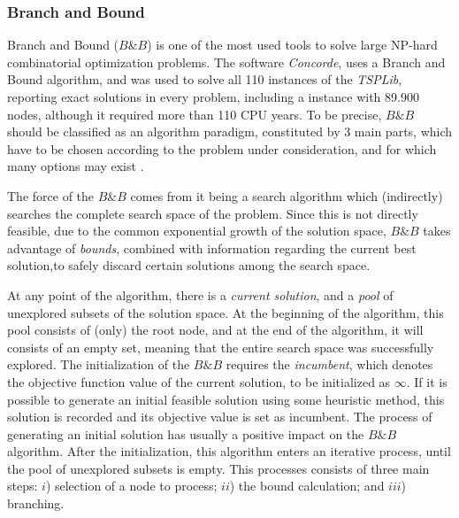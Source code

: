 \subsubsection{Branch and Bound}
\label{sec:bnb}

Branch and Bound ($B\&B$) is one of the most used tools to solve large NP-hard combinatorial optimization problems. The software \textit{Concorde}, uses a Branch and Bound algorithm, and was used to solve all 110 instances of the \textit{TSPLib}, reporting exact solutions in every problem, including a instance with 89.900 nodes, although it required more than 110 CPU years. To be precise, $B\&B$ should be classified as an algorithm paradigm, constituted by 3 main parts, which have to be chosen according to the problem under consideration, and for which many options may exist \cite{bnb_review}.

The force of the $B\&B$ comes from it being a search algorithm which (indirectly) searches the complete search space of the problem. Since this is not directly feasible, due to the common exponential growth of the solution space, $B\&B$ takes advantage of \textit{bounds}, combined with information regarding the current best solution,to safely discard certain solutions among the search space.

At any point of the algorithm, there is a \textit{current solution}, and a \textit{pool} of unexplored subsets of the solution space. At the beginning of the algorithm, this pool consists of (only) the root node, and at the end of the algorithm, it will consists of an empty set, meaning that the entire search space was successfully explored. The initialization of the $B\&B$ requires the \textit{incumbent}, which denotes the objective function value of the current solution, to be initialized as $\infty$. If it is possible to generate an initial feasible solution using some heuristic method, this solution is recorded and its objective value is set as incumbent. The process of generating an initial solution has usually a positive impact on the $B\&B$ algorithm. After the initialization, this algorithm enters an iterative process, until the pool of unexplored subsets is empty. This processes consists of three main steps: $i$) selection of a node to process; $ii$) the bound calculation; and $iii$) branching.

